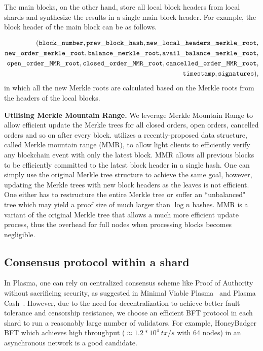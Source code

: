The main blocks, on the other hand, store all local block headers from local shards and synthesize the results in a single main block header. For example, the block header of the main block can be as follows.

\begin{align*}
({\mathtt{block\_number}}, {\mathtt{prev\_block\_hash}}, {\mathtt{new\_local\_headers\_merkle\_root}}, \\ {\mathtt{new\_order\_merkle\_root}}, {\mathtt{balance\_merkle\_root}}, {\mathtt{avail\_balance\_merkle\_root}}, \\ {\mathtt{open\_order\_MMR\_root}}, {\mathtt{closed\_order\_MMR\_root}}, {\mathtt{cancelled\_order\_MMR\_root}},\\ {\mathtt{timestamp}}, {\mathtt{signatures}}),
\end{align*}
in which all the new Merkle roots are calculated based on the Merkle roots from the headers of the local blocks.

\textbf{Utilising Merkle Mountain Range.} We leverage Merkle Mountain Range to allow efficient update the Merkle trees for all closed orders, open orders, cancelled orders and so on after every block. \codename utilizes a recently-proposed data structure, called Merkle mountain range (MMR), to allow light clients to efficiently verify any blockchain event with only the latest block.
MMR allows all previous blocks to be efficiently committed to the latest block header in a single hash. One can simply use the original Merkle tree structure to achieve the same goal, however, updating the Merkle trees with new block headers as the leaves is not efficient. One either has to restructure the entire Merkle tree or suffer an ``unbalanced" tree which may yield a proof size of much larger than $\log{n}$ hashes. MMR is a variant of the original Merkle tree that allows a much more efficient update process, thus the overhead for full nodes when processing blocks becomes negligible.

\subsection{Consensus protocol within a shard}\label{shard-consensus}
In Plasma, one can rely on centralized consensus scheme like Proof of Authority without sacrificing security, as suggested in Minimal Viable Plasma~\cite{plasma-mvp} and Plasma Cash~\cite{plasma-cash}. However, due to the need for decentralization to achieve better fault tolerance and censorship resistance, we choose an efficient BFT protocol in each shard to run a reasonably large number of validators. For example, HoneyBadger BFT\cite{honeybadger} which achieves high throughput ($\approx 1.2*10^4\hspace{3pt} tx/s$ with 64 nodes) in an asynchronous network is a good candidate.

